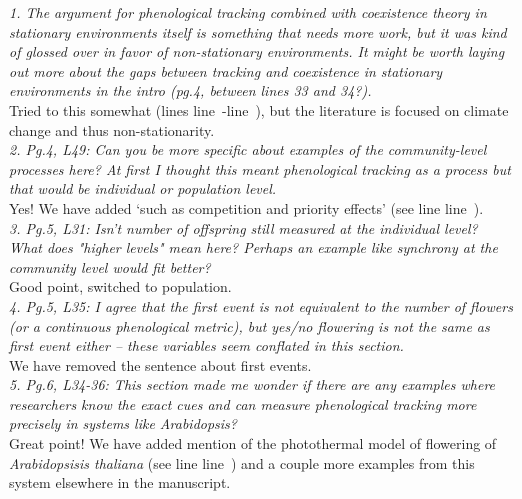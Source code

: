 \documentclass[11pt]{article}
\newcommand{\lr}[1]{line~\lineref{#1}}
\begin{document}
\emph{1.      The argument for phenological tracking combined with coexistence theory in stationary
environments itself is something that needs more work, but it was kind of glossed over in
favor of non-stationary environments. It might be worth laying out more about the gaps
between tracking and coexistence in stationary environments in the intro (pg.4, between lines
33 and 34?).}\\

Tried to this somewhat (lines \lr{r2stat}-\lr{r2statend}), but the literature is focused on climate change and thus non-stationarity.\\

\emph{2.      Pg.4, L49: Can you be more specific about examples of the community-level processes
here? At first I thought this meant phenological tracking as a process but that would be
individual or population level.}\\

Yes! We have added `such as competition and priority effects' (see line \lr{r2example}).\\

\emph{3.      Pg.5, L31: Isn't number of offspring still measured at the individual level? What
does "higher levels" mean here? Perhaps an example like synchrony at the community level
would fit better?}\\

Good point, switched to population.\\

\emph{4.      Pg.5, L35: I agree that the first event is not equivalent to the number of flowers
(or a continuous phenological metric), but yes/no flowering is not the same as first event
either – these variables seem conflated in this section.}\\

We have removed the sentence about first events.\\

\emph{5.      Pg.6, L34-36: This section made me wonder if there are any examples where researchers
know the exact cues and can measure phenological tracking more precisely in systems like
Arabidopsis?}\\

Great point! We have added mention of the photothermal model of flowering of  \emph{Arabidopsisis thaliana} (see line \lr{r2arab}) and a couple more examples from this system elsewhere in the manuscript.\\
\end{document}
